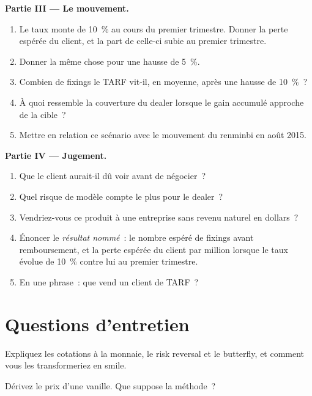 \begin{problem}
\medskip\noindent\textbf{Partie III --- Le mouvement.}
\begin{enumerate}[resume]
\item Le taux monte de 10~\% au cours du premier trimestre. Donner la perte espérée du client, et la part de celle-ci subie au premier trimestre.
\item Donner la même chose pour une hausse de 5~\%.
\item Combien de fixings le TARF vit-il, en moyenne, après une hausse de 10~\%~?
\item À quoi ressemble la couverture du dealer lorsque le gain accumulé approche de la cible~?
\item Mettre en relation ce scénario avec le mouvement du renminbi en août 2015.
\end{enumerate}

\medskip\noindent\textbf{Partie IV --- Jugement.}
\begin{enumerate}[resume]
\item Que le client aurait-il dû voir avant de négocier~?
\item Quel risque de modèle compte le plus pour le dealer~?
\item Vendriez-vous ce produit à une entreprise sans revenu naturel en dollars~?
\item Énoncer le \emph{résultat nommé}~: le nombre espéré de fixings avant remboursement, et la perte espérée du client par million lorsque le taux
évolue de 10~\% contre lui au premier trimestre.
\item En une phrase~: que vend un client de TARF~?
\end{enumerate}
\end{problem}

\section{Questions d'entretien}

\begin{interviewq}\label{iq:dv:fx-derivatives:1}
Expliquez les cotations à la monnaie, le risk reversal et le butterfly, et comment vous les transformeriez en smile.
\end{interviewq}

\begin{interviewq}\label{iq:dv:fx-derivatives:2}
Dérivez le prix  d'une vanille. Que suppose la méthode~?
\end{interviewq}

